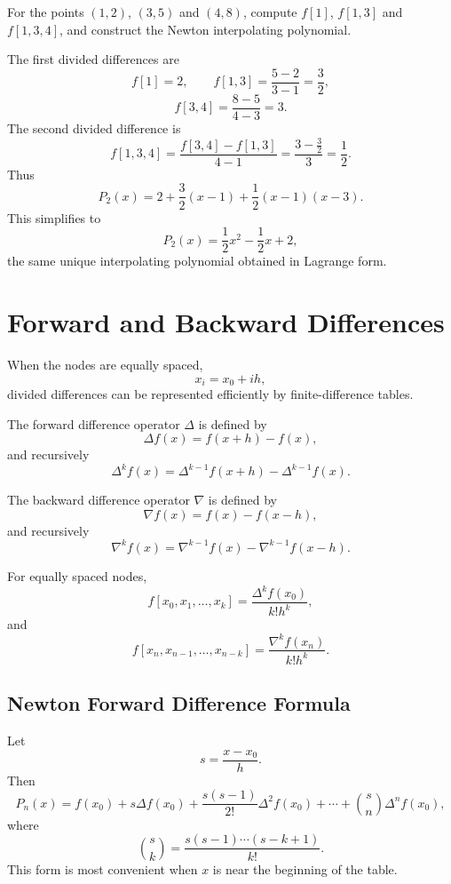 \begin{example}
For the points $(1,2)$, $(3,5)$ and $(4,8)$, compute
$f[1]$, $f[1,3]$ and $f[1,3,4]$, and construct the Newton interpolating polynomial.
\end{example}

\begin{solution}[5.5cm]
The first divided differences are
\[
 f[1]=2,
 \qquad
 f[1,3]=\frac{5-2}{3-1}=\frac32,
\]
\[
 f[3,4]=\frac{8-5}{4-3}=3.
\]
The second divided difference is
\[
 f[1,3,4]
 =\frac{f[3,4]-f[1,3]}{4-1}
 =\frac{3-\frac32}{3}
 =\frac12.
\]
Thus
\[
 P_2(x)=2+\frac32(x-1)+\frac12(x-1)(x-3).
\]
This simplifies to
\[
 P_2(x)=\frac12x^2-\frac12x+2,
\]
the same unique interpolating polynomial obtained in Lagrange form.
\end{solution}

\section{Forward and Backward Differences}

When the nodes are equally spaced,
\[
 x_i=x_0+ih,
\]
divided differences can be represented efficiently by finite-difference tables.

\begin{definition}
The forward difference operator $\Delta$ is defined by
\[
 \Delta f(x)=f(x+h)-f(x),
\]
and recursively
\[
 \Delta^k f(x)=\Delta^{k-1}f(x+h)-\Delta^{k-1}f(x).
\]
\end{definition}

\begin{definition}
The backward difference operator $\nabla$ is defined by
\[
 \nabla f(x)=f(x)-f(x-h),
\]
and recursively
\[
 \nabla^k f(x)=\nabla^{k-1}f(x)-\nabla^{k-1}f(x-h).
\]
\end{definition}

For equally spaced nodes,
\[
 f[x_0,x_1,\ldots,x_k]
 =\frac{\Delta^k f(x_0)}{k!h^k},
\]
and
\[
 f[x_n,x_{n-1},\ldots,x_{n-k}]
 =\frac{\nabla^k f(x_n)}{k!h^k}.
\]

\subsection{Newton Forward Difference Formula}

Let
\[
 s=\frac{x-x_0}{h}.
\]
Then
\[
 P_n(x)=f(x_0)
 +s\Delta f(x_0)
 +\frac{s(s-1)}{2!}\Delta^2f(x_0)
 +\cdots
 +\binom{s}{n}\Delta^nf(x_0),
\]
where
\[
 \binom{s}{k}
 =\frac{s(s-1)\cdots(s-k+1)}{k!}.
\]
This form is most convenient when $x$ is near the beginning of the table.

